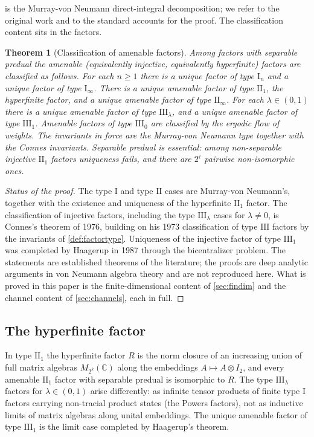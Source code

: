 \documentclass[11pt,letterpaper]{article}
\newtheorem{theorem}{Theorem}[section]
\theoremstyle{definition}
\theoremstyle{remark}
\begin{document}
 is the Murray-von Neumann direct-integral decomposition; we refer to the original work and to the standard accounts for the proof. The classification content sits in the factors.

\begin{theorem}[Classification of amenable factors]
\label{thm:amenable}
Among factors with separable predual the amenable (equivalently injective, equivalently hyperfinite) factors are classified as follows. For each $n \geq 1$ there is a unique factor of type $\mathrm{I}_n$ and a unique factor of type $\mathrm{I}_\infty$. There is a unique amenable factor of type $\mathrm{II}_1$, the hyperfinite factor, and a unique amenable factor of type $\mathrm{II}_\infty$. For each $\lambda \in (0,1)$ there is a unique amenable factor of type $\mathrm{III}_\lambda$, and a unique amenable factor of type $\mathrm{III}_1$. Amenable factors of type $\mathrm{III}_0$ are classified by the ergodic flow of weights. The invariants in force are the Murray-von Neumann type together with the Connes invariants. Separable predual is essential: among non-separable injective $\mathrm{II}_1$ factors uniqueness fails, and there are $2^{\mathfrak{c}}$ pairwise non-isomorphic ones.
\end{theorem}

\begin{proof}[Status of the proof]
The type $\mathrm{I}$ and type $\mathrm{II}$ cases are Murray-von Neumann's, together with the existence and uniqueness of the hyperfinite $\mathrm{II}_1$ factor. The classification of injective factors, including the type $\mathrm{III}_\lambda$ cases for $\lambda \neq 0$, is Connes's theorem of 1976, building on his 1973 classification of type $\mathrm{III}$ factors by the invariants of \cref{def:factortype}. Uniqueness of the injective factor of type $\mathrm{III}_1$ was completed by Haagerup in 1987 through the bicentralizer problem. The statements are established theorems of the literature; the proofs are deep analytic arguments in von Neumann algebra theory and are not reproduced here. What is proved in this paper is the finite-dimensional content of \cref{sec:findim} and the channel content of \cref{sec:channels}, each in full.
\end{proof}

\subsection{The hyperfinite factor}

In type $\mathrm{II}_1$ the hyperfinite factor $R$ is the norm closure of an increasing union of full matrix algebras $M_{2^k}(\mathbb{C})$ along the embeddings $A \mapsto A \otimes I_2$, and every amenable $\mathrm{II}_1$ factor with separable predual is isomorphic to $R$. The type $\mathrm{III}_\lambda$ factors for $\lambda \in (0,1)$ arise differently: as infinite tensor products of finite type I factors carrying non-tracial product states (the Powers factors), not as inductive limits of matrix algebras along unital embeddings. The unique amenable factor of type $\mathrm{III}_1$ is the limit case completed by Haagerup's theorem.
\end{document}

